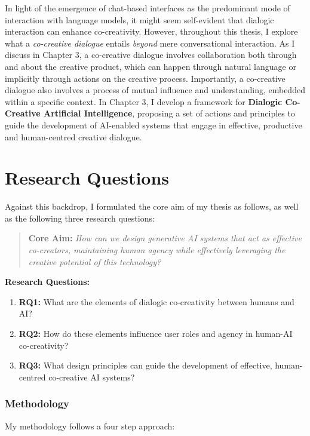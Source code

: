 In light of the emergence of chat-based interfaces as the predominant mode of interaction with language models, it might seem self-evident that dialogic interaction can enhance co-creativity. However, throughout this thesis, I explore what a \textit{co-creative dialogue} entails \textit{beyond} mere conversational interaction. As I discuss in Chapter 3, a co-creative dialogue involves collaboration both through and about the creative product, which can happen through natural language or implicitly through actions on the creative process. Importantly, a co-creative dialogue also involves a process of mutual influence and understanding, embedded within a specific context. In Chapter 3, I develop a framework for \textbf{Dialogic Co-Creative Artificial Intelligence}, proposing a set of actions and principles to guide the development of AI-enabled systems that engage in effective, productive and human-centred creative dialogue. 

\section{Research Questions}

Against this backdrop, I formulated the core aim of my thesis as follows, as well as the following three research questions: 

\begin{quote}
\textbf{Core Aim:}
\emph{How can we design generative AI systems that act as effective co-creators, maintaining human agency while effectively leveraging the creative potential of this technology?}
\end{quote}

\textbf{Research Questions:}
\begin{enumerate}
    \item \textbf{RQ1:} What are the elements of dialogic co-creativity between humans and AI?
    \item \textbf{RQ2:} How do these elements influence user roles and agency in human-AI co-creativity?
    \item \textbf{RQ3:} What design principles can guide the development of effective, human-centred co-creative AI systems?
\end{enumerate}

\subsubsection{Methodology}

My methodology follows a four step approach:

